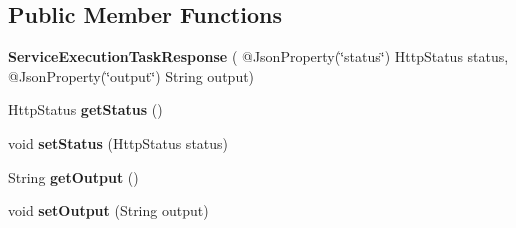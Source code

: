 \subsection*{Public Member Functions}
\begin{DoxyCompactItemize}
\item 
\mbox{\label{classeu_1_1h2020_1_1symbiote_1_1enabler_1_1messaging_1_1model_1_1ServiceExecutionTaskResponse_ae28626295a1f9f140e2226e8f9ac5696}} 
{\bfseries Service\+Execution\+Task\+Response} ( @Json\+Property(\char`\"{}status\char`\"{}) Http\+Status status, @Json\+Property(\char`\"{}output\char`\"{}) String output)
\item 
\mbox{\label{classeu_1_1h2020_1_1symbiote_1_1enabler_1_1messaging_1_1model_1_1ServiceExecutionTaskResponse_abc6ffdb55bb241bb72c074f83101bc9b}} 
Http\+Status {\bfseries get\+Status} ()
\item 
\mbox{\label{classeu_1_1h2020_1_1symbiote_1_1enabler_1_1messaging_1_1model_1_1ServiceExecutionTaskResponse_a8176872ecc463560d4f73987a00d31d5}} 
void {\bfseries set\+Status} (Http\+Status status)
\item 
\mbox{\label{classeu_1_1h2020_1_1symbiote_1_1enabler_1_1messaging_1_1model_1_1ServiceExecutionTaskResponse_aa82557740fdb60708c5340900ff257b6}} 
String {\bfseries get\+Output} ()
\item 
\mbox{\label{classeu_1_1h2020_1_1symbiote_1_1enabler_1_1messaging_1_1model_1_1ServiceExecutionTaskResponse_ae8b625263d200c06318b1ee11e31401e}} 
void {\bfseries set\+Output} (String output)
\item 
\mbox{\label{classeu_1_1h2020_1_1symbiote_1_1enabler_1_1messaging_1_1model_1_1ServiceExecutionTaskResponse_a8d9780761a6fb2cbfce18a8db4082625}} 

\end{DoxyCompactItemize}
